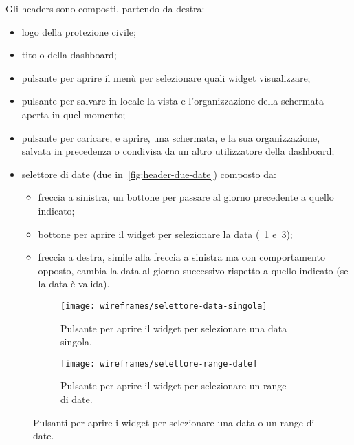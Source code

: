 Gli headers sono composti, partendo da destra:
\begin{itemize}
    \item logo della protezione civile;
    \item titolo della dashboard;
    \item pulsante per aprire il menù per selezionare quali widget visualizzare;
    \item pulsante per salvare in locale la vista e l'organizzazione della schermata aperta in quel momento;
    \item pulsante per caricare, e aprire, una schermata, e la sua organizzazione, salvata in precedenza o condivisa da un altro utilizzatore della dashboard;
    \item selettore di date (due in~\ref{fig:header-due-date}) composto da:
        \begin{itemize}
            \item freccia a sinistra, un bottone per passare al giorno precedente a quello indicato;
            \item bottone per aprire il widget per selezionare la data (~\ref{fig:selettore-data-singola} e~\ref{fig:selettore-range-date});
            \item freccia a destra, simile alla freccia a sinistra ma con comportamento opposto, cambia la data al giorno successivo rispetto a quello indicato (se la data è valida).
        \end{itemize}
\end{itemize}

\begin{figure}[H]
    \begin{subfigure}[b]{0.5\textwidth}
        \centering
        \texttt{[image: wireframes/selettore-data-singola]}
        \caption{Pulsante per aprire il widget per selezionare una data singola.}\label{fig:selettore-data-singola}
    \end{subfigure}
\hfill
    \begin{subfigure}[b]{0.5\textwidth}
        \centering
        \texttt{[image: wireframes/selettore-range-date]}
        \caption{Pulsante per aprire il widget per selezionare un range di date.}\label{fig:selettore-range-date}
    \end{subfigure}
    \caption{Pulsanti per aprire i widget per selezionare una data o un range di date.}
\end{figure}

